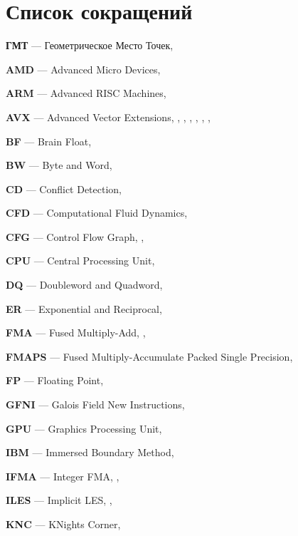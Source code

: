 \newpage

\section*{Список сокращений}

\textbf{ГМТ} --- Геометрическое Место Точек, \pageref{abbr:gmt}

\textbf{AMD} --- Advanced Micro Devices, \pageref{abbr:amd}

\textbf{ARM} --- Advanced RISC Machines, \pageref{abbr:arm}

\textbf{AVX} --- Advanced Vector Extensions, \pageref{abbr:avx}, \pageref{abbr:avx2}, \pageref{abbr:avx3}, \pageref{abbr:avx4}, \pageref{abbr:avx5}, \pageref{abbr:avx6}, \pageref{abbr:avx7}

\textbf{BF} --- Brain Float, \pageref{abbr:bf}

\textbf{BW} --- Byte and Word, \pageref{abbr:bw}

\textbf{CD} --- Conflict Detection, \pageref{abbr:cd}

\textbf{CFD} --- Computational Fluid Dynamics, \pageref{abbr:cfd}

\textbf{CFG} --- Control Flow Graph, \pageref{abbr:cfg}, \pageref{abbr:cfg2}

\textbf{CPU} --- Central Processing Unit, \pageref{abbr:cpu}

\textbf{DQ} --- Doubleword and Quadword, \pageref{abbr:dq}

\textbf{ER} --- Exponential and Reciprocal, \pageref{abbr:er}

\textbf{FMA} --- Fused Multiply-Add, \pageref{abbr:fma}, \pageref{abbr:fma2}

\textbf{FMAPS} --- Fused Multiply-Accumulate Packed Single Precision, \pageref{abbr:fmaps}
 
\textbf{FP} --- Floating Point, \pageref{abbr:fp}

\textbf{GFNI} --- Galois Field New Instructions, \pageref{abbr:gfni}

\textbf{GPU} --- Graphics Processing Unit, \pageref{abbr:gpu}

\textbf{IBM} --- Immersed Boundary Method, \pageref{abbr:ibm}

\textbf{IFMA} --- Integer FMA, \pageref{abbr:ifma}, \pageref{abbr:ifma2}

\textbf{ILES} --- Implicit LES, \pageref{abbr:iles}, \pageref{abbr:iles2}

\textbf{KNC} --- KNights Corner, \pageref{abbr:knc}

